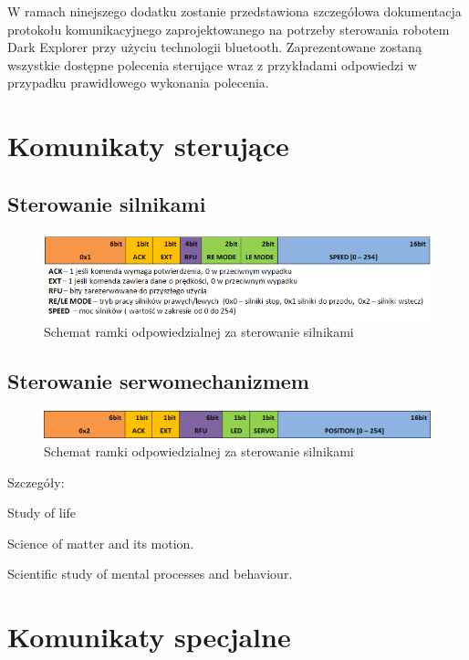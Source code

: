 W ramach ninejszego dodatku zostanie przedstawiona szczegółowa dokumentacja
protokołu komunikacyjnego zaprojektowanego na potrzeby sterowania robotem Dark
Explorer przy użyciu technologii bluetooth. Zaprezentowane zostaną wszystkie
dostępne polecenia sterujące wraz z przykładami odpowiedzi w przypadku
prawidłowego wykonania polecenia.

\section{Komunikaty sterujące}
\subsection{Sterowanie silnikami}
\begin{figure}[h!] 
 \centering
 \includegraphics[width=\textwidth]{../images/appendix/cmd_0x01.png}
 \caption{Schemat ramki odpowiedzialnej za sterowanie silnikami}
 \label{fig:CMD_0x01}
\end{figure}

\subsection{Sterowanie serwomechanizmem}
\begin{figure}[h!] 
 \centering
 \includegraphics[width=\textwidth]{../images/appendix/cmd_0x02.png}
 \caption{Schemat ramki odpowiedzialnej za sterowanie silnikami}
 \label{fig:CMD_0x02}
\end{figure}

Szczegóły:
\begin{description}[itemsep=0pt,topsep=0pt, partopsep=0pt]
\item[Biology] Study of life
\item[Physics] Science of matter and its motion.
\item[Psychology] Scientific study of mental processes and behaviour.
\end{description}

\section{Komunikaty specjalne}